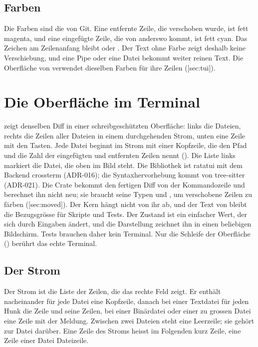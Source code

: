 \subsection{Farben}

Die Farben sind die von Git. Eine entfernte Zeile, die verschoben wurde, ist fett magenta,
und eine eingefügte Zeile, die von anderswo kommt, ist fett cyan. Das Zeichen am Zeilenanfang
bleibt \type{-} oder \type{+}. Der Text ohne Farbe zeigt deshalb keine Verschiebung, und eine
Pipe oder eine Datei bekommt weiter reinen Text. Die Oberfläche von  verwendet
dieselben Farben für ihre Zeilen ([sec:tui]).

\section[sec:tui]{Die Oberfläche im Terminal}

 zeigt denselben Diff in einer schreibgeschützten Oberfläche: links die Dateien,
rechts die Zeilen aller Dateien in einem durchgehenden Strom, unten eine Zeile mit den Tasten.
Jede Datei beginnt im Strom mit einer Kopfzeile, die den Pfad und die Zahl der eingefügten und
entfernten Zeilen nennt (). Die Liste links markiert die Datei, die oben im Bild steht.
Die Bibliothek ist ratatui mit dem Backend crossterm (ADR-016); die Syntaxhervorhebung
kommt von tree-sitter (ADR-021). Die Crate 
bekommt den fertigen Diff von der Kommandozeile und berechnet ihn nicht neu; sie braucht seine
Typen und , um verschobene Zeilen zu färben ([sec:moved]).
Der Kern hängt nicht von ihr ab, und der Text von  bleibt die Bezugsgrösse für Skripte
und Tests.
Der Zustand ist ein einfacher Wert, der sich durch Eingaben ändert, und die
Darstellung zeichnet ihn in einen beliebigen Bildschirm. Tests brauchen daher kein Terminal. Nur
die Schleife der Oberfläche () berührt das echte Terminal.

\subsection{Der Strom}

Der Strom ist die Liste der Zeilen, die das rechte Feld zeigt. Er enthält nacheinander für jede
Datei eine Kopfzeile, danach bei einer Textdatei für jeden Hunk die Zeile  und seine
Zeilen, bei einer Binärdatei oder einer zu grossen Datei eine Zeile mit der Meldung. Zwischen
zwei Dateien steht eine Leerzeile; sie gehört zur Datei darüber. Eine Zeile des Stroms heisst
im Folgenden kurz Zeile, eine Zeile einer Datei Dateizeile.


